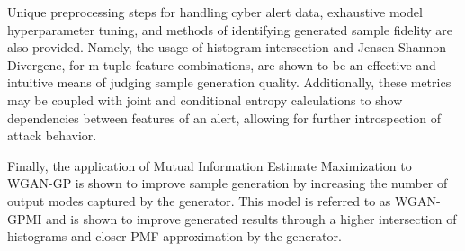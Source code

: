 Unique preprocessing steps for handling cyber alert data, exhaustive model hyperparameter tuning, and methods of identifying generated sample fidelity are also provided. Namely, the usage of histogram intersection and Jensen Shannon Divergenc, for m-tuple feature combinations, are shown to be an effective and intuitive means of judging sample generation quality. Additionally, these metrics may be coupled with joint and conditional entropy calculations to show dependencies between features of an alert, allowing for further introspection of attack behavior.

Finally, the application of Mutual Information Estimate Maximization to WGAN-GP is shown to improve sample generation by increasing the number of output modes captured by the generator. This model is referred to as WGAN-GPMI and is shown to improve generated results through a higher intersection of histograms and closer PMF approximation by the generator.
